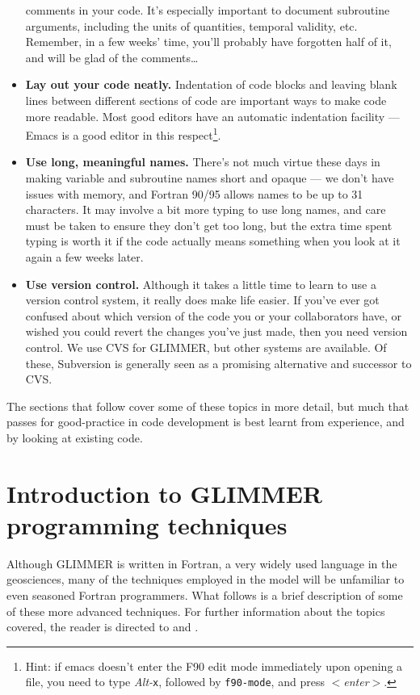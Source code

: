 \begin{itemize}
  comments in your code. It's especially important to document subroutine
  arguments, including the units of quantities, temporal validity,
  etc. Remember, in a few weeks' time, you'll probably have forgotten half of
  it, and will be glad of the comments\ldots
\item \textbf{Lay out your code neatly.} Indentation of code blocks and leaving blank lines
  between different sections of code are important ways to make code
  more readable. Most good editors have an automatic indentation facility ---
  Emacs is a good editor in this respect\footnote{Hint: if emacs doesn't enter
  the F90 edit mode immediately upon opening a file, you need to type \emph{Alt-}\texttt{x},
  followed by \texttt{f90-mode}, and press \emph{$<$enter$>$}.}.
\item \textbf{Use long, meaningful names.} There's not much virtue these days
  in making variable and subroutine names short and opaque --- we don't have
  issues with memory, and Fortran 90/95 allows names to be up to 31
  characters. It may involve a bit more typing to use long names, and care
  must be taken to ensure they don't get too long, but the extra time spent
  typing is worth it if the code actually means something when you look at it
  again a few weeks later.
\item \textbf{Use version control.} Although it takes a little time to learn
  to use a version control system, it really does make life easier. If you've
  ever got confused about which version of the code you or your collaborators
  have, or wished you could revert the changes you've just made, then you need
  version control. We use CVS for GLIMMER, but other systems are available. Of
  these, Subversion is generally seen as a promising alternative and successor
  to CVS.
\end{itemize}
The sections that follow cover some of these topics in more detail, but much
that passes for good-practice in code development is best learnt from
experience, and by looking at existing code.
%
\section{Introduction to GLIMMER programming techniques}
%
Although GLIMMER is written in Fortran, a very widely used language in the
geosciences, many of the techniques employed in the model will be unfamiliar
to even seasoned Fortran programmers. What follows is a brief description of
some of these more advanced techniques. For further information about the
topics covered, the reader is directed to \cite{Metcalf1999} and \cite{Decyk1997}.
%
